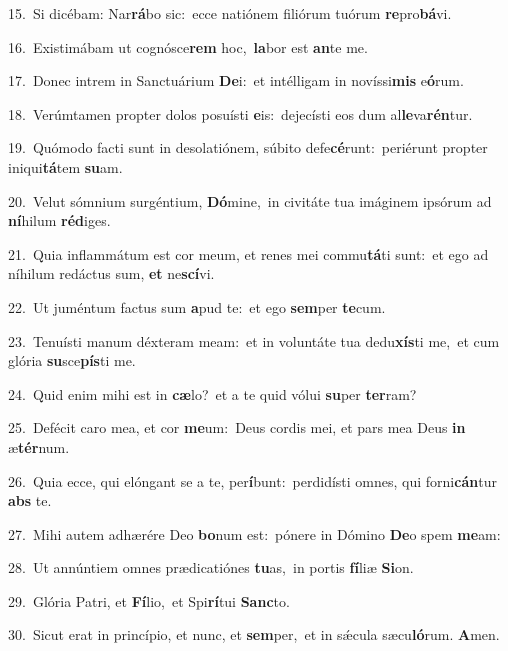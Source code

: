 {\numbfont\textcolor{\numbcolor}{15.}}~Si dicébam: Nar\-\textbf{rá}\-bo sic:~\star ecce natiónem filiórum tuórum \textbf{re}\-pro\-\textbf{bá}\-vi.\par
{\numbfont\textcolor{\numbcolor}{16.}}~Existimábam ut cognósce\textbf{rem} hoc,~\star \textbf{la}\-bor est \textbf{an}\-te me.\par
{\numbfont\textcolor{\numbcolor}{17.}}~Donec intrem in Sanctuárium \textbf{De}\-i:~\star et intélligam in novíssi\textbf{mis} e\-\textbf{ó}\-rum.\par
{\numbfont\textcolor{\numbcolor}{18.}}~Verúmtamen propter dolos posuísti \textbf{e}\-is:~\star dejecísti eos dum al\-\textbf{le}\-va\-\textbf{rén}\-tur.\par
{\numbfont\textcolor{\numbcolor}{19.}}~Quómodo facti sunt in desolatiónem, súbito defe\-\textbf{cé}\-runt:~\star periérunt propter iniqui\-\textbf{tá}\-tem \textbf{su}\-am.\par
{\numbfont\textcolor{\numbcolor}{20.}}~Velut sómnium surgéntium, \textbf{Dó}\-mine,~\star in civitáte tua imáginem ipsórum ad \textbf{ní}\-hilum \textbf{réd}\-iges.\par
{\numbfont\textcolor{\numbcolor}{21.}}~Quia inflammátum est cor meum, et renes mei commu\-\textbf{tá}\-ti sunt:~\star et ego ad níhilum redáctus sum, \textbf{et} ne\-\textbf{scí}\-vi.\par
{\numbfont\textcolor{\numbcolor}{22.}}~Ut juméntum factus sum \textbf{a}\-pud te:~\star et ego \textbf{sem}\-per \textbf{te}\-cum.\par
{\numbfont\textcolor{\numbcolor}{23.}}~Tenuísti manum déxteram meam:~\dagger et in voluntáte tua dedu\-\textbf{xís}\-ti me,~\star et cum glória \textbf{su}\-sce\-\textbf{pís}\-ti me.\par
{\numbfont\textcolor{\numbcolor}{24.}}~Quid enim mihi est in \textbf{cæ}\-lo?~\star et a te quid vólui \textbf{su}\-per \textbf{ter}\-ram?\par
{\numbfont\textcolor{\numbcolor}{25.}}~Defécit caro mea, et cor \textbf{me}\-um:~\star Deus cordis mei, et pars mea Deus \textbf{in} æ\-\textbf{tér}\-num.\par
{\numbfont\textcolor{\numbcolor}{26.}}~Quia ecce, qui elóngant se a te, per\-\textbf{í}\-bunt:~\star perdidísti omnes, qui forni\-\textbf{cán}\-tur \textbf{abs} te.\par
{\numbfont\textcolor{\numbcolor}{27.}}~Mihi autem adhærére Deo \textbf{bo}\-num est:~\star pónere in Dómino \textbf{De}\-o spem \textbf{me}\-am:\par
{\numbfont\textcolor{\numbcolor}{28.}}~Ut annúntiem omnes prædicatiónes \textbf{tu}\-as,~\star in portis \textbf{fí}\-liæ \textbf{Si}\-on.\par
{\numbfont\textcolor{\numbcolor}{29.}}~Glória Patri, et \textbf{Fí}\-lio,~\star et Spi\-\textbf{rí}\-tui \textbf{Sanc}\-to.\par
{\numbfont\textcolor{\numbcolor}{30.}}~Sicut erat in princípio, et nunc, et \textbf{sem}\-per,~\star et in sǽcula sæcu\-\textbf{ló}\-rum. \textbf{A}\-men.\par
